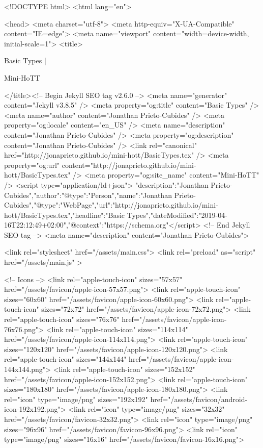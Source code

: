 <!DOCTYPE html>
<html lang="en">

<head>
  <meta charset="utf-8">
  <meta http-equiv="X-UA-Compatible" content="IE=edge">
  <meta name="viewport" content="width=device-width, initial-scale=1">
  <title>
    
      
        Basic Types |
      
        Mini-HoTT
    
  </title><!-- Begin Jekyll SEO tag v2.6.0 -->
<meta name="generator" content="Jekyll v3.8.5" />
<meta property="og:title" content="Basic Types" />
<meta name="author" content="Jonathan Prieto-Cubides" />
<meta property="og:locale" content="en_US" />
<meta name="description" content="Jonathan Prieto-Cubides" />
<meta property="og:description" content="Jonathan Prieto-Cubides" />
<link rel="canonical" href="http://jonaprieto.github.io/mini-hott/BasicTypes.tex" />
<meta property="og:url" content="http://jonaprieto.github.io/mini-hott/BasicTypes.tex" />
<meta property="og:site_name" content="Mini-HoTT" />
<script type="application/ld+json">
{"description":"Jonathan Prieto-Cubides","author":{"@type":"Person","name":"Jonathan Prieto-Cubides"},"@type":"WebPage","url":"http://jonaprieto.github.io/mini-hott/BasicTypes.tex","headline":"Basic Types","dateModified":"2019-04-16T22:12:49+02:00","@context":"https://schema.org"}</script>
<!-- End Jekyll SEO tag -->
<meta name="description" content="Jonathan Prieto-Cubides">

  <link rel="stylesheet" href="/assets/main.css">
  <link rel="preload" as="script" href="/assets/main.js" >

  <!-- Icons -->
  <link rel="apple-touch-icon" sizes="57x57" href="/assets/favicon/apple-icon-57x57.png">
  <link rel="apple-touch-icon" sizes="60x60" href="/assets/favicon/apple-icon-60x60.png">
  <link rel="apple-touch-icon" sizes="72x72" href="/assets/favicon/apple-icon-72x72.png">
  <link rel="apple-touch-icon" sizes="76x76" href="/assets/favicon/apple-icon-76x76.png">
  <link rel="apple-touch-icon" sizes="114x114" href="/assets/favicon/apple-icon-114x114.png">
  <link rel="apple-touch-icon" sizes="120x120" href="/assets/favicon/apple-icon-120x120.png">
  <link rel="apple-touch-icon" sizes="144x144" href="/assets/favicon/apple-icon-144x144.png">
  <link rel="apple-touch-icon" sizes="152x152" href="/assets/favicon/apple-icon-152x152.png">
  <link rel="apple-touch-icon" sizes="180x180" href="/assets/favicon/apple-icon-180x180.png">
  <link rel="icon" type="image/png" sizes="192x192"  href="/assets/favicon/android-icon-192x192.png">
  <link rel="icon" type="image/png" sizes="32x32" href="/assets/favicon/favicon-32x32.png">
  <link rel="icon" type="image/png" sizes="96x96" href="/assets/favicon/favicon-96x96.png">
  <link rel="icon" type="image/png" sizes="16x16" href="/assets/favicon/favicon-16x16.png">

